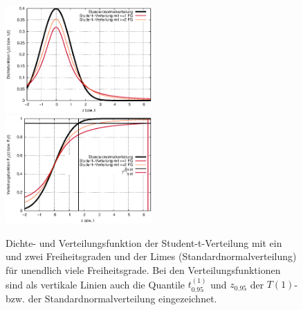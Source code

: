 \begin{figure}
\includegraphics[width=0.5\textwidth]{figsRegr/f_gaussStudent.eps}
\includegraphics[width=0.5\textwidth]{figsRegr/F_gaussStudent.eps}
\caption{\label{fig:student}Dichte- und Verteilungsfunktion der
Student-t-Verteilung mit ein und zwei Freiheitsgraden und der Limes
(Standardnormalverteilung) f\"ur unendlich viele Freiheitsgrade. Bei
den Verteilungsfunktionen sind als vertikale Linien auch die Quantile
$t^{(1)}_{0.95}$ und $z_{0.95}$ der $T(1)$- bzw. der
Standardnormalverteilung eingezeichnet.
}
\end{figure}


